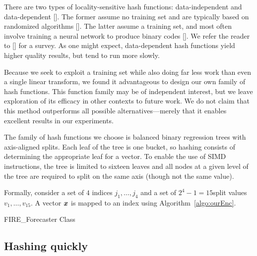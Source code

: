 There are two types of locality-sensitive hash functions: data-independent and data-dependent []. The former assume no training set and are typically based on randomized algorithms []. The latter assume a training set, and most often involve training a neural network to produce binary codes []. We refer the reader to [] for a survey. As one might expect, data-dependent hash functions yield higher quality results, but tend to run more slowly.

Because we seek to exploit a training set while also doing far less work than even a single linear transform, we found it advantageous to design our own family of hash functions. This function family may be of independent interest, but we leave exploration of its efficacy in other contexts to future work. We do not claim that this method outperforms all possible alternatives---merely that it enables excellent results in our experiments.

The family of hash functions we choose is balanced binary regression trees with axis-aligned splits. Each leaf of the tree is one bucket, so hashing consists of determining the appropriate leaf for a vector. To enable the use of SIMD instructions, the tree is limited to sixteen leaves and all nodes at a given level of the tree are required to split on the same axis (though not the same value).

Formally, consider a set of $4$ indices ${j_1,\ldots,j_4}$ and a set of $2^4 - 1 = 15$split values $v_1,\ldots,v_15$. A vector $\bm{x}$ is mapped to an index using Algorithm~\ref{algo:ourEnc}.

\begin{algorithm}[h]
\caption{FIRE\_Forecaster Class} \label{algo:xff}
\begin{algorithmic}[1]

\end{algorithmic}
\end{algorithm}

\subsection{Hashing quickly}


